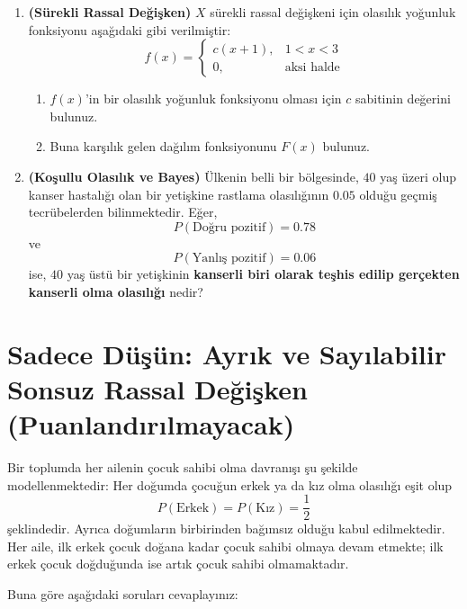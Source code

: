 \documentclass[12pt,a4paper]{article}
\begin{document}
\begin{enumerate}
\newpage

\item \textbf{(Sürekli Rassal Değişken)} $X$ sürekli rassal değişkeni için olasılık yoğunluk fonksiyonu aşağıdaki gibi verilmiştir:
\[
f(x)=
\begin{cases}
c(x+1), & 1<x<3 \\
0, & \text{aksi halde}
\end{cases}
\]
\begin{enumerate}
\item $f(x)$'in bir olasılık yoğunluk fonksiyonu olması için $c$ sabitinin değerini bulunuz.
\item Buna karşılık gelen dağılım fonksiyonunu $F(x)$ bulunuz.
\end{enumerate}

\vspace{0.5cm}

\item \textbf{(Koşullu Olasılık ve Bayes)} Ülkenin belli bir bölgesinde, $40$ yaş üzeri olup kanser hastalığı olan bir yetişkine rastlama olasılığının $0.05$ olduğu geçmiş tecrübelerden bilinmektedir. Eğer,
\[
P(\text{Doğru pozitif}) = 0.78
\]
ve
\[
P(\text{Yanlış pozitif}) = 0.06
\]
ise, $40$ yaş üstü bir yetişkinin \textbf{kanserli biri olarak teşhis edilip gerçekten kanserli olma olasılığı} nedir?
\end{enumerate}

\vspace{1cm}
\section*{\textbf{\color{TitleColor}Sadece Düşün: Ayrık ve Sayılabilir Sonsuz  Rassal Değişken (Puanlandırılmayacak)}}

Bir toplumda her ailenin çocuk sahibi olma davranışı şu şekilde modellenmektedir: Her doğumda çocuğun erkek ya da kız olma olasılığı eşit olup
\[
P(\text{Erkek}) = P(\text{Kız}) = \frac{1}{2}
\]
şeklindedir. Ayrıca doğumların birbirinden bağımsız olduğu kabul edilmektedir. Her aile, ilk erkek çocuk doğana kadar çocuk sahibi olmaya devam etmekte; ilk erkek çocuk doğduğunda ise artık çocuk sahibi olmamaktadır.

Buna göre aşağıdaki soruları cevaplayınız:
\end{document}
